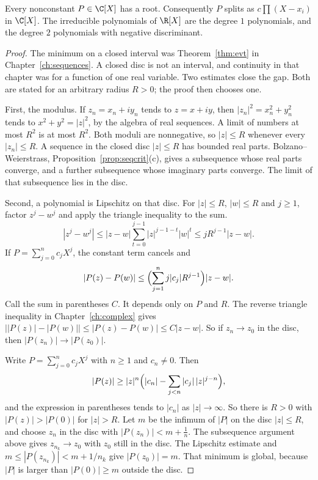 \begin{theorem}\label{thm:dalembert}
Every nonconstant $P\in\C[X]$ has a root. Consequently $P$ splits as $c\prod(X-x_i)$ in $\C[X]$. The irreducible polynomials of $\R[X]$ are the degree $1$ polynomials, and the degree $2$ polynomials with negative discriminant.
\end{theorem}
\begin{proof}
The minimum on a closed interval was Theorem~\ref{thm:evt} in Chapter~\ref{ch:sequences}. A closed disc is not an interval, and continuity in that chapter was for a function of one real variable. Two estimates close the gap. Both are stated for an arbitrary radius $R>0$; the proof then chooses one.

First, the modulus. If $z_n=x_n+iy_n$ tends to $z=x+iy$, then $|z_n|^2=x_n^2+y_n^2$ tends to $x^2+y^2=|z|^2$, by the algebra of real sequences. A limit of numbers at most $R^2$ is at most $R^2$. Both moduli are nonnegative, so $|z|\le R$ whenever every $|z_n|\le R$. A sequence in the closed disc $|z|\le R$ has bounded real parts. Bolzano--Weierstrass, Proposition~\ref{prop:seqcrit}(c), gives a subsequence whose real parts converge, and a further subsequence whose imaginary parts converge. The limit of that subsequence lies in the disc.

Second, a polynomial is Lipschitz on that disc. For $|z|\le R$, $|w|\le R$ and $j\ge1$, factor $z^j-w^j$ and apply the triangle inequality to the sum.
\[
|z^j-w^j|\le|z-w|\sum_{t=0}^{j-1}|z|^{j-1-t}|w|^t\le j R^{j-1}|z-w|.
\]
If $P=\sum_{j=0}^n c_j X^j$, the constant term cancels and
\[
|P(z)-P(w)|\le\Bigl(\sum_{j=1}^n j|c_j|R^{j-1}\Bigr)|z-w|.
\]
Call the sum in parentheses $C$. It depends only on $P$ and $R$. The reverse triangle inequality in Chapter~\ref{ch:complex} gives $\bigl||P(z)|-|P(w)|\bigr|\le|P(z)-P(w)|\le C|z-w|$. So if $z_n\to z_0$ in the disc, then $|P(z_n)|\to|P(z_0)|$.

Write $P=\sum_{j=0}^nc_jX^j$ with $n\ge1$ and $c_n\ne0$. Then
\[
|P(z)|\ge|z|^n\Bigl(|c_n|-\sum_{j<n}|c_j|\,|z|^{j-n}\Bigr),
\]
and the expression in parentheses tends to $|c_n|$ as $|z|\to\infty$. So there is $R>0$ with $|P(z)|>|P(0)|$ for $|z|>R$. Let $m$ be the infimum of $|P|$ on the disc $|z|\le R$, and choose $z_n$ in the disc with $|P(z_n)|<m+\frac1n$. The subsequence argument above gives $z_{n_k}\to z_0$ with $z_0$ still in the disc. The Lipschitz estimate and $m\le |P(z_{n_k})|<m+1/n_k$ give $|P(z_0)|=m$. That minimum is global, because $|P|$ is larger than $|P(0)|\ge m$ outside the disc.


\end{proof}
